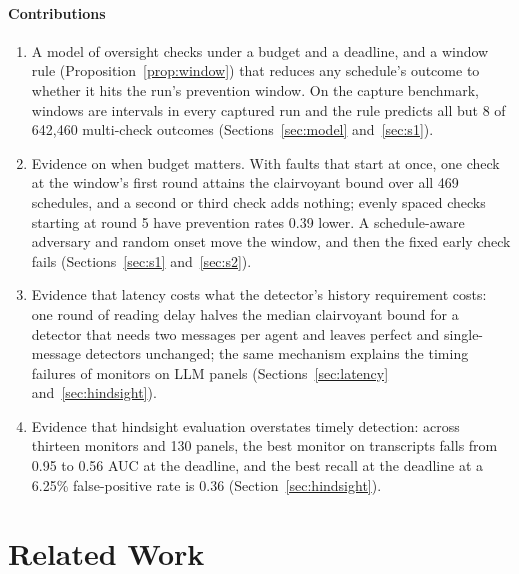 \documentclass[pdflatex,sn-mathphys-num]{sn-jnl}
\theoremstyle{thmstyleone}%
\begin{document}
\paragraph{Contributions}
\begin{enumerate}
  \item A model of oversight checks under a budget and a deadline, and a window rule (Proposition~\ref{prop:window}) that reduces any schedule's outcome to whether it hits the run's prevention window. On the capture benchmark, windows are intervals in every captured run and the rule predicts all but 8 of 642{,}460 multi-check outcomes (Sections~\ref{sec:model} and~\ref{sec:s1}).
  \item Evidence on when budget matters. With faults that start at once, one check at the window's first round attains the clairvoyant bound over all 469 schedules, and a second or third check adds nothing; evenly spaced checks starting at round 5 have prevention rates 0.39 lower. A schedule-aware adversary and random onset move the window, and then the fixed early check fails (Sections~\ref{sec:s1} and~\ref{sec:s2}).
  \item Evidence that latency costs what the detector's history requirement costs: one round of reading delay halves the median clairvoyant bound for a detector that needs two messages per agent and leaves perfect and single-message detectors unchanged; the same mechanism explains the timing failures of monitors on LLM panels (Sections~\ref{sec:latency} and~\ref{sec:hindsight}).
  \item Evidence that hindsight evaluation overstates timely detection: across thirteen monitors and 130 panels, the best monitor on transcripts falls from 0.95 to 0.56 AUC at the deadline, and the best recall at the deadline at a 6.25\% false-positive rate is 0.36 (Section~\ref{sec:hindsight}).
\end{enumerate}

\section{Related Work}
\label{sec:rw}
\end{document}
